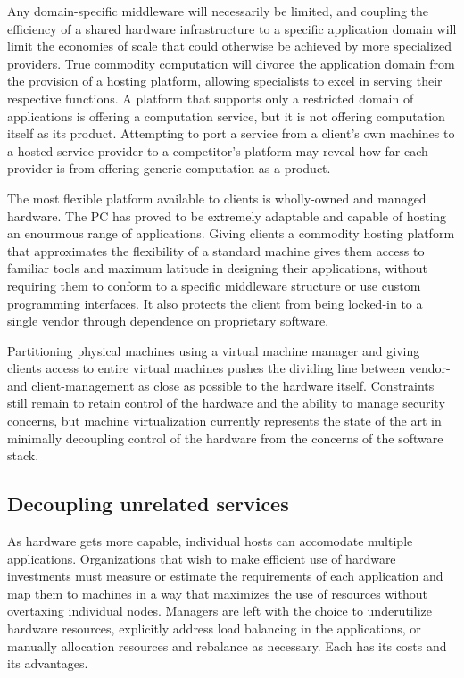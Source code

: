 Any domain-specific middleware will necessarily be limited, and coupling the efficiency of a shared hardware infrastructure to a specific application domain will limit the economies of scale that could otherwise be achieved by more specialized providers. True commodity computation will divorce the application domain from the provision of a hosting platform, allowing specialists to excel in serving their respective functions. A platform that supports only a restricted domain of applications is offering a computation service, but it is not offering computation itself as its product. Attempting to port a service from a client's own machines to a hosted service provider to a competitor's platform may reveal how far each provider is from offering generic computation as a product.

The most flexible platform available to clients is wholly-owned and managed hardware. The PC has proved to be extremely adaptable and capable of hosting an enourmous range of applications. Giving clients a commodity hosting platform that approximates the flexibility of a standard machine gives them access to familiar tools and maximum latitude in designing their applications, without requiring them to conform to a specific middleware structure or use custom programming interfaces. It also protects the client from being locked-in to a single vendor through dependence on proprietary software.

Partitioning physical machines using a virtual machine manager and giving clients access to entire virtual machines pushes the dividing line between vendor- and client-management as close as possible to the hardware itself. Constraints still remain to retain control of the hardware and the ability to manage security concerns, but machine virtualization currently represents the state of the art in minimally decoupling control of the hardware from the concerns of the software stack.

\subsection{Decoupling unrelated services}

As hardware gets more capable, individual hosts can accomodate multiple applications. Organizations that wish to make efficient use of hardware investments must measure or estimate the requirements of each application and map them to machines in a way that maximizes the use of resources without overtaxing individual nodes. Managers are left with the choice to underutilize hardware resources, explicitly address load balancing in the applications, or manually allocation resources and rebalance as necessary. Each has its costs and its advantages.

